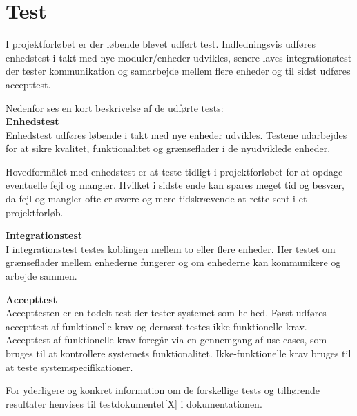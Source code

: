 \section{Test}

\label{chap:test}

I projektforløbet er der løbende blevet udført test. Indledningsvis udføres enhedstest i takt med nye moduler/enheder udvikles, senere laves integrationstest der tester kommunikation og samarbejde mellem flere enheder og til sidst udføres accepttest.

Nedenfor ses en kort beskrivelse af de udførte tests:\\


\textbf{Enhedstest} \\
Enhedstest udføres løbende i takt med nye enheder udvikles. Testene udarbejdes for at sikre kvalitet, funktionalitet og grænseflader i de nyudviklede enheder. 

Hovedformålet med enhedstest er at teste tidligt i projektforløbet for at opdage eventuelle fejl og mangler. Hvilket i sidste ende kan spares meget tid og besvær, da fejl og mangler ofte er svære og mere tidskrævende at rette sent i et projektforløb.


\textbf{Integrationstest} \\
I integrationstest testes koblingen mellem to eller flere enheder. Her testet om grænseflader mellem enhederne fungerer og om enhederne kan kommunikere og arbejde sammen.  



\textbf{Accepttest} \\
Accepttesten er en todelt test der tester systemet som helhed. 
Først udføres accepttest af funktionelle krav og dernæst testes ikke-funktionelle krav.
Accepttest af funktionelle krav foregår via en gennemgang af use cases, som bruges til at kontrollere systemets funktionalitet. Ikke-funktionelle krav bruges til at teste systemspecifikationer.  

For yderligere og konkret information om de forskellige tests og tilhørende resultater henvises til testdokumentet[X] i dokumentationen.
